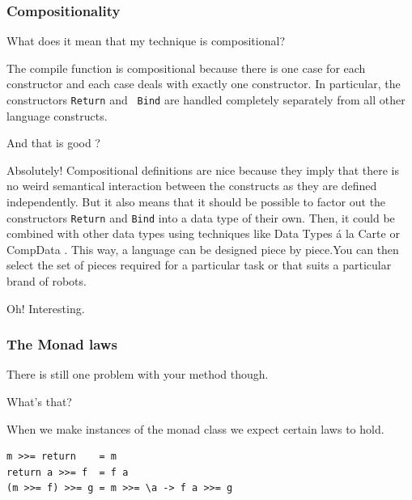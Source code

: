 \subsubsection{Compositionality} 

\begin{dialogue} 
\speak{\studname{}} What does it mean that my technique is compositional?

\speak{\docname{}} The compile function is compositional because there
is one case for each constructor and each case deals with exactly one
constructor. In particular, the constructors {\tt Return} and {\tt
  Bind} are handled completely separately from all other language
constructs.

\speak{\studname{}} And that is good ? 

\speak{\docname{}} Absolutely! Compositional definitions are nice
because they imply that there is no weird semantical interaction
between the constructs as they are defined independently. But it also
means that it should be possible to factor out the constructors
\texttt{Return} and \texttt{Bind} into a data type of their own. Then,
it could be combined with other data types using techniques like Data
Types \'{a} la Carte  or CompData . This
way, a language can be designed piece by piece.You can then select the
set of pieces required for a particular task or that suits a
particular brand of robots.

\speak{\studname{}} Oh! Interesting.
\end{dialogue}


\subsubsection{The Monad laws} 

\begin{dialogue}
\speak{\docname{}} There is still one problem with your method though.

\speak{\studname{}} What's that?

\speak{\docname{}} When we make instances of the monad class we expect
certain laws to hold. 

\end{dialogue}

\begin{small}
\begin{verbatim}
m >>= return    = m
return a >>= f  = f a
(m >>= f) >>= g = m >>= \a -> f a >>= g
\end{verbatim}
\end{small}

